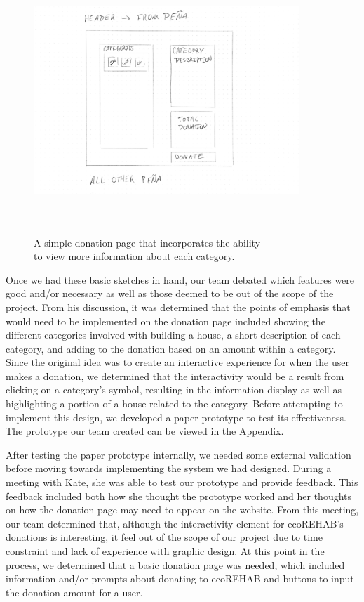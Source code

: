 \documentclass[letter]{article}
\begin{document}
\begin{figure}[H]
	\includegraphics[width=10cm, height=10cm]{Example5}
	\captionsetup{justification=centering}
	\centering
	\caption{A simple donation page that incorporates the ability \\ to view more information about each category.}
	\label{fig:3}
\end{figure}

Once we had these basic sketches in hand, our team debated which features were good and/or necessary as well as those deemed to be out of the scope of the project. From his discussion, it was determined that the points of emphasis that would need to be implemented on the donation page included showing the different categories involved with building a house, a short description of each category, and adding to the donation based on an amount within a category. Since the original idea was to create an interactive experience for when the user makes a donation, we determined that the interactivity would be a result from clicking on a category's symbol, resulting in the information display as well as highlighting a portion of a house related to the category. Before attempting to implement this design, we developed a paper prototype to test its effectiveness. The prototype our team created can be viewed in the Appendix.

After testing the paper prototype internally, we needed some external validation before moving towards implementing the system we had designed. During a meeting with Kate, she was able to test our prototype and provide feedback. This feedback included both how she thought the prototype worked and her thoughts on how the donation page may need to appear on the website. From this meeting, our team determined that, although the interactivity element for ecoREHAB's donations is interesting, it feel out of the scope of our project due to time constraint and lack of experience with graphic design. At this point in the process, we determined that a basic donation page was needed, which included information and/or prompts about donating to ecoREHAB and buttons to input the donation amount for a user.
\end{document}
